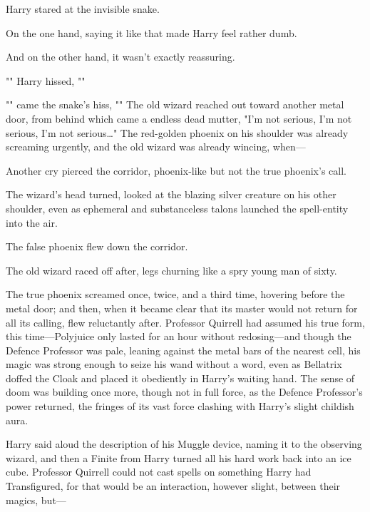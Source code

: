 Harry stared at the invisible snake.

On the one hand, saying it like that made Harry feel rather dumb.

And on the other hand, it wasn’t exactly reassuring.

"" Harry hissed, ""

"" came the snake’s hiss, ""
\later
The old wizard reached out toward another metal door, from behind which came a
endless dead mutter, "I’m not serious, I’m not serious, I’m not
serious…" The red-golden phoenix on his shoulder was already screaming
urgently, and the old wizard was already wincing, when—

Another cry pierced the corridor, phoenix-like but not the true phoenix’s call.

The wizard’s head turned, looked at the blazing silver creature on his other
shoulder, even as ephemeral and substanceless talons launched the spell-entity
into the air.

The false phoenix flew down the corridor.

The old wizard raced off after, legs churning like a spry young man of sixty.

The true phoenix screamed once, twice, and a third time, hovering before the
metal door; and then, when it became clear that its master would not return for
all its calling, flew reluctantly after.
\later
Professor Quirrell had assumed his true form, this time—Polyjuice only lasted
for an hour without redosing—and though the Defence Professor was pale,
leaning against the metal bars of the nearest cell, his magic was strong enough
to seize his wand without a word, even as Bellatrix doffed the Cloak and placed
it obediently in Harry’s waiting hand. The sense of doom was building once
more, though not in full force, as the Defence Professor’s power returned, the
fringes of its vast force clashing with Harry’s slight childish aura.

Harry said aloud the description of his Muggle device, naming it to the
observing wizard, and then a Finite from Harry turned all his hard work back
into an ice cube. Professor Quirrell could not cast spells on something Harry
had Transfigured, for that would be an interaction, however slight, between
their magics, but—

